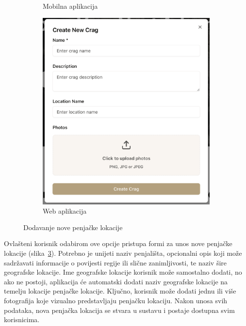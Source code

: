 \begin{figure}[H]
\begin{subfigure}[b]{0.31\textwidth}
        \caption{Mobilna aplikacija}
        \label{fig:dodavanje_lokacije_mob}
    \end{subfigure}
    \hfill
    \begin{subfigure}[b]{0.6\textwidth}
        \centering
        \includegraphics[width=\textwidth]{images/implementacija/web/editing-options/create-crag.png}
        \caption{Web aplikacija}
        \label{fig:dodavanje_lokacije_web}
    \end{subfigure}
    \caption{Dodavanje nove penjačke lokacije}
    \label{fig:dodavanje_lokacije}
\end{figure}

Ovlašteni korisnik odabirom ove opcije pristupa formi za unos nove penjačke lokacije (slika~\ref{fig:dodavanje_lokacije}). Potrebno je unijeti naziv penjališta, opcionalni opis koji može sadržavati informacije o povijesti regije ili slične zanimljivosti, te naziv šire geografske lokacije. Ime geografske lokacije korisnik može samostalno dodati, no ako ne postoji, aplikacija će automatski dodati naziv geografske lokacije na temelju lokacije penjačke lokacije. Ključno, korisnik može dodati jednu ili više fotografija koje vizualno predstavljaju penjačku lokaciju. Nakon unosa svih podataka, nova penjačka lokacija se stvara u sustavu i postaje dostupna svim korisnicima.

